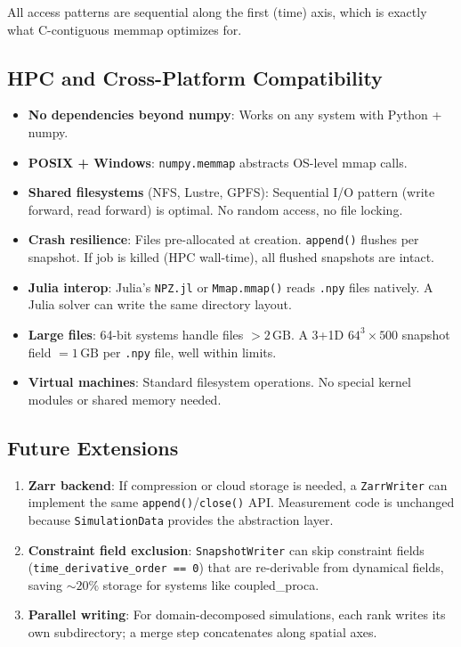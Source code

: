 All access patterns are sequential along the first (time) axis, which is exactly what C-contiguous memmap optimizes for.


\subsection{HPC and Cross-Platform Compatibility}
\label{sec:adr-hpc}

\begin{itemize}
  \item \textbf{No dependencies beyond numpy}: Works on any system with Python + numpy.
  \item \textbf{POSIX + Windows}: \texttt{numpy.memmap} abstracts OS-level mmap calls.
  \item \textbf{Shared filesystems} (NFS, Lustre, GPFS): Sequential I/O pattern (write forward, read forward) is optimal. No random access, no file locking.
  \item \textbf{Crash resilience}: Files pre-allocated at creation. \texttt{append()} flushes per snapshot. If job is killed (HPC wall-time), all flushed snapshots are intact.
  \item \textbf{Julia interop}: Julia's \texttt{NPZ.jl} or \texttt{Mmap.mmap()} reads \texttt{.npy} files natively. A Julia solver can write the same directory layout.
  \item \textbf{Large files}: 64-bit systems handle files ${>}2\,\text{GB}$. A 3+1D $64^3 \times 500$ snapshot field $= 1\,\text{GB}$ per \texttt{.npy} file, well within limits.
  \item \textbf{Virtual machines}: Standard filesystem operations. No special kernel modules or shared memory needed.
\end{itemize}


\subsection{Future Extensions}
\label{sec:adr-future}

\begin{enumerate}
  \item \textbf{Zarr backend}: If compression or cloud storage is needed, a \texttt{ZarrWriter} can implement the same \texttt{append()}/\texttt{close()} API. Measurement code is unchanged because \texttt{SimulationData} provides the abstraction layer.
  \item \textbf{Constraint field exclusion}: \texttt{SnapshotWriter} can skip constraint fields (\texttt{time\_derivative\_order == 0}) that are re-derivable from dynamical fields, saving ${\sim}20\%$ storage for systems like coupled\_proca.
  \item \textbf{Parallel writing}: For domain-decomposed simulations, each rank writes its own subdirectory; a merge step concatenates along spatial axes.
\end{enumerate}


